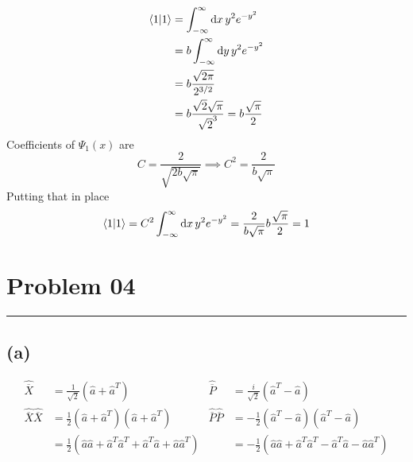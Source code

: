 \documentclass[letter, 10pts]{article}
\begin{document}
\begin{align*}
\braket{1 | 1} 
&= 
\int_{-\infty}^{\infty} 
\mathrm{d} x \, 
y^2 e^{ - y^2 } 
\\
&= b
\int_{-\infty}^{\infty} 
\mathrm{d} y \, 
y^2 e^{ - y^2 }  \\ 
&=b \frac{\sqrt{2 \pi } }{2^{3 / 2}} \\
&= b \frac{\sqrt{2} \sqrt{\pi} }{\sqrt{2} ^{3}} = b \frac{ \sqrt{\pi}  }{2} \\
\end{align*}
Coefficients of $\Psi_1(x)$ are 
\[
C = \frac{2}{ \sqrt{2b \sqrt{\pi} } } \implies C^2
= 
\frac{2}{b \sqrt{\pi} }
\] 
Putting that in place 
\[
\braket{1 | 1} = C^2 \int_{-\infty}^{\infty} \mathrm{d} x \, y^2 e^{- y^2}  = \frac{2}{b \sqrt{\pi } } b \frac{\sqrt{\pi } }{2} = 1
\] 



























\newpage
\section*{Problem 04} 
\hrule 
\subsection*{(a)} 
\begin{align*}
	\hat{\overline{X}} &= \frac{1}{\sqrt{2} } (\hat{a} + \hat{a}^{T}) 
			   &
			   \hat{\overline{P}} &= \frac{i}{\sqrt{2} } (\hat{a}^{T} - \hat{a}) \\
\hat{\overline{X}} \hat{\overline{X}} 
					      &= \frac{1}{2} 
					      \left(\hat{a} + \hat{a}^{T}\right)
					      \left(\hat{a}+ \hat{a}^{T}\right) 
					      &
					    \hat{\overline{P}}
					    \hat{\overline{P}}
					    &= -
					    \frac{1}{2} 
					    \left(\hat{a}^{T} - \hat{a}\right)
					    \left(\hat{a}^{T} - \hat{a}\right) 
					 \\ &=
					    \frac{1}{2}
					    \left(
					    \hat{a}\hat{a}
				    + \hat{a}^{T}\hat{a}^{T}
			    + \hat{a}^{T} \hat{a} + 
		    \hat{a} \hat{a}^{T}\right)
					    & &=-\frac{1}{2} 
					    \left(
					    \hat{a}\hat{a}
				    + \hat{a}^{T}\hat{a}^{T}
			    - \hat{a}^{T} \hat{a} - 
		    \hat{a} \hat{a}^{T} 
					    \right)
\end{align*}
\end{document}
